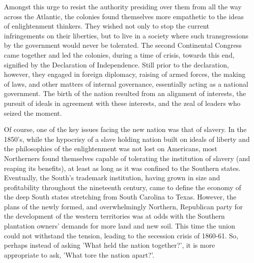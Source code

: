 \documentclass[a4paper]{article}
\begin{document}
Amongst this urge to resist the authority presiding over them from all the way across the Atlantic, the colonies found themselves more empathetic to the ideas of enlightenment thinkers. They wished not only to stop the current infringements on their liberties, but to live in a society where such transgressions by the government would never be tolerated. The second Continental Congress came together and led the colonies, during a time of crisis, towards this end, signified by the Declaration of Independence. Still prior to the declaration, however, they engaged in foreign diplomacy, raising of armed forces, the making of laws, and other matters of internal governance, essentially acting as a national government. \autocite[pp. 176]{AmericanRep1} The birth of the nation resulted from an alignment of interests, the pursuit of ideals in agreement with these interests, and the zeal of leaders who seized the moment.

Of course, one of the key issues facing the new nation was that of slavery. In the 1850’s, while the hypocrisy of a slave holding nation built on ideals of liberty and the philosophies of the enlightenment was not lost on Americans, most Northerners found themselves capable of tolerating the institution of slavery (and reaping its benefits), at least as long as it was confined to the Southern states. Eventually, the South’s trademark institution, having grown in size and profitability throughout the nineteenth century, came to define the economy of the deep South states stretching from South Carolina to Texas. However, the plans of the newly formed, and overwhelmingly Northern, Republican party for the development of the western territories was at odds with the Southern plantation owners’ demands for more land and new soil. \autocite{EconomicOrig} This time the union could not withstand the tension, leading to the secession crisis of 1860-61. So, perhaps instead of asking 'What held the nation together?’, it is more appropriate to ask, 'What tore the nation apart?’.
\end{document}
